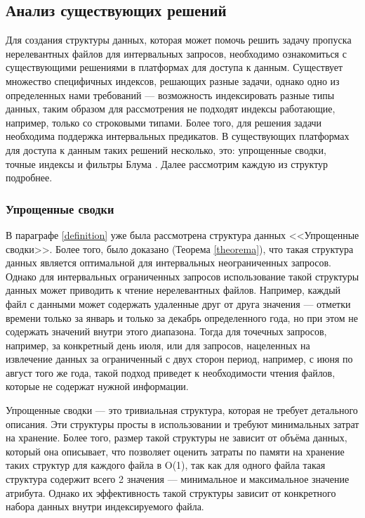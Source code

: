 \subsection{Анализ существующих решений}\label{indexes}

Для создания структуры данных, которая может помочь решить задачу пропуска нерелевантных файлов для интервальных запросов, необходимо ознакомиться с существующими решениями в платформах для доступа к данным. Существует множество специфичных индексов, решающих разные задачи, однако одно из определенных нами требований --- возможность индексировать разные типы данных, таким образом для рассмотрения не подходят индексы работающие, например, только со строковыми типами. Более того, для решения задачи необходима поддержка интервальных предикатов. В существующих платформах для доступа к данным таких решений несколько, это: упрощенные сводки, точные индексы и фильтры Блума \cite{Extensible_data_skipping}. Далее рассмотрим каждую из структур подробнее.

\subsubsection{Упрощенные сводки}\label{column_stats}

В параграфе \ref{definition} уже была рассмотрена структура данных {<<Упрощенные сводки>>}. Более того, было доказано (Теорема \ref{theorema}), что такая структура данных является оптимальной для интервальных неограниченных запросов. Однако для интервальных ограниченных запросов использование такой структуры данных может приводить к чтение нерелевантных файлов. Например, каждый файл с данными может содержать удаленные друг от друга значения --- отметки времени только за январь и только за декабрь определенного года, но при этом не содержать значений внутри этого диапазона. Тогда для точечных запросов, например, за конкретный день июля, или для запросов, нацеленных на извлечение данных за ограниченный с двух сторон период, например, с июня по август того же года, такой подход приведет к необходимости чтения файлов, которые не содержат нужной информации.

Упрощенные сводки --- это тривиальная структура, которая не требует детального описания. Эти структуры просты в использовании и требуют минимальных затрат на хранение. Более того, размер такой структуры не зависит от объёма данных, который она описывает, что позволяет оценить затраты по памяти на хранение таких структур для каждого файла в O(1), так как для одного файла такая структура содержит всего 2 значения --- минимальное и максимальное значение атрибута. Однако их эффективность такой структуры зависит от конкретного набора данных внутри индексируемого файла.

